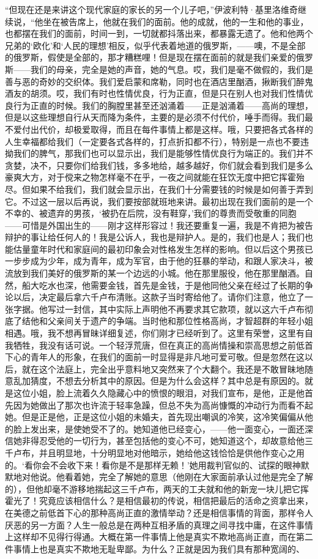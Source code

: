 \par “但现在还是来讲这个现代家庭的家长的另一个儿子吧，”伊波利特·基里洛维奇继续说，“他坐在被告席上，他就在我们的面前。他的成就，他的一生和他的事业，也都摆在我们的面前，时间一到，一切就都抖落出来，都暴露无遗了。他和他两个兄弟的‘欧化’和‘人民的理想’相反，似乎代表着地道的俄罗斯，——噢，不是全部的俄罗斯，假使是全部的，那才糟糕哩！但是现在摆在面前的就是我们亲爱的俄罗斯——我们的母亲，完全是她的声音，她的气息。哎，我们是毫不做假的，我们是善与恶的奇妙的交织体。我们爱启蒙和席勒，同时也在酒店里酗酒，揪断我们醉鬼酒友的胡须。哎，我们有时也性情优良，行为正直，但是只在别人也对我们性情优良行为正直的时候。我们的胸膛里甚至还汹涌着——正是汹涌着——高尚的理想，但是以这些理想自行从天而降为条件，主要的是必须不付代价，唾手而得。我们最不爱付出代价，却极爱取得，而且在每件事情上都是这样。哦，只要把各式各样的人生幸福都给我们（一定要各式各样的，打点折扣都不行），特别是一点也不要违拗我们的脾气，那我们也可以显示出，我们是能够性情优良行为端正的。我们并不贪婪，决不，只要你们给我们钱，多多地给，越多越好，你们就会看到我们是多么豪爽大方，对于傥来之物怎样毫不在乎，一夜之间就能在狂饮无度中把它挥霍殆尽。但如果不给我们，我们就会显示出，在我们十分需要钱的时候是如何善于弄到它。不过这一层以后再说，我们要按部就班地来讲。最初出现在我们面前的是一个不幸的、被遗弃的男孩，‘被扔在后院，没有鞋穿，’我们的尊贵而受敬重的同胞——可惜是外国出生的——刚才这样形容过！我还要重复一遍，我是不肯把为被告辩护的事让给任何人的！我是公诉人，我也是辩护人。是的，我们也是人；我们也能估量童年时代和家庭间的最初印象会对性格发生怎样的影响。但以后这个男孩已一步步成为少年，成为青年，成为军官，由于他的狂暴的举动，和跟人家决斗，被流放到我们美好的俄罗斯的某一个边远的小城。他在那里服役，他在那里酗酒。自然，船大吃水也深，他需要金钱，首先是金钱，于是他同他父亲在经过了长期的争论以后，决定最后拿六千卢布清账。这款子当时寄给他了。请你们注意，他立了一张字据。他写过一封信，其中实际上声明他不再要求其它款项，就以这六千卢布彻底了结他和父亲间关于遗产的争端。当时他和那位性格高尚，才智超群的年轻小姐相遇。哦，我不想再冒昧详细复述，你们刚才已经听到了。这里有荣誉，这里有自我牺牲，我没有话可说。一个轻浮荒唐，但在真正的高尚情操和崇高思想之前低首下心的青年人的形象，在我们的面前一时显得是非凡地可爱可敬。但是忽然在这以后，就在这个法庭上，完全出乎意料地又突然来了个大翻个。我还是不敢冒昧地随意乱加猜度，不想去分析其中的原因。但是为什么会这样？其中总是有原因的。就是这位小姐，脸上流着久久隐藏心中的愤恨的眼泪，对我们宣布，是他，正是他首先因为她做出了那次也许流于轻率急躁，但总不失为高尚慷慨的冲动行为而看不起她。但是正是他，正是这位小姐的未婚夫，首先现出嘲讽的冷笑，这冷笑偏偏从他的脸上发出来，是使她受不了的。她知道他已经变心，——他一面变心，一面还深信她非得忍受他的一切行为，甚至包括他的变心不可，她知道这个，却故意给他三千卢布，并且明显地，十分明显地对他暗示，她给他这钱恰恰是供他作变心之用的。‘看你会不会收下来！看你是不是那样无赖！’她用裁判官似的、试探的眼神默默地对他说。他看着她，完全了解她的意思（他刚在大家面前承认过他是完全了解的），但他却毫不游移地揣起这三千卢布，两天的工夫就和他的新宠一块儿把它挥霍光了！究竟应该相信什么？是相信最初的传说，相信把最后的活命之资拿出来，在美德之前低首下心的那种高尚正直的激情举动？还是相信事情的背面，那样令人厌恶的另一方面？人生一般总是在两种互相矛盾的真理之间寻找中庸，在这件事情上这样却不见得行得通。大概在第一件事情上他是真实不欺地高尚正直，而在第二件事情上也是真实不欺地无耻卑鄙。为什么？正就是因为我们具有那种宽阔的、